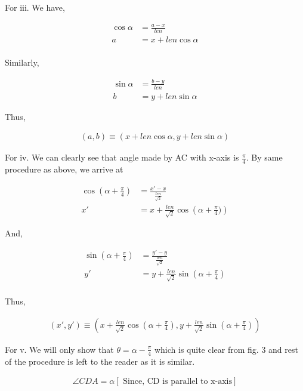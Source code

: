 \documentclass{article}
\begin{document}
For iii. We have,

\begin{align*}
    \cos \alpha &= \frac{a-x}{len}\\
    a &= x + len \cos \alpha\\
\end{align*}

Similarly,

\begin{align*}
    \sin \alpha &= \frac{b-y}{len}\\
    b &= y +len \sin \alpha
\end{align*}

Thus,

\begin{align*} 
    (a, b) \equiv (x+len \cos \alpha, y + len \sin \alpha)
\end{align*}

For iv. We can clearly see that angle made by AC with x-axis is \(\frac{\pi}{4}\). By same procedure as above, we arrive at

\begin{align*}
    \cos \left(\alpha + \frac{\pi}{4}\right) &= \frac{x'-x}{\frac{len}{\sqrt{ 2}}}\\
    x' &= x + \frac{len}{\sqrt{2}} \cos\left(\alpha + \frac{\pi}{4})\right)
\end{align*}

    And, 

\begin{align*}
    \sin \left(\alpha + \frac{\pi}{4}\right) &= \frac{y'-y}{\frac{len}{\sqrt{ 2}}}\\
    y' &= y + \frac{len}{\sqrt{2}} \sin \left(\alpha + \frac{\pi}{4}\right)\\
\end{align*}

    Thus, 

\begin{align*}
(x', y') \equiv \left(x+\frac{len }{\sqrt{2}} \cos (\alpha + \frac{\pi}{4}), y + \frac{len}{\sqrt{2}} \sin (\alpha + \frac{\pi}{4})\right)
\end{align*}

For v. We will only show that \(\theta = \alpha - \frac{\pi}{4}\) which is quite clear from fig. 3 and rest of the procedure is left to the reader as it is similar.

\begin{align*}
    \angle CDA = \alpha \left[\text{ Since, CD is parallel to x-axis}\right]\\
\end{align*}
\end{document}
